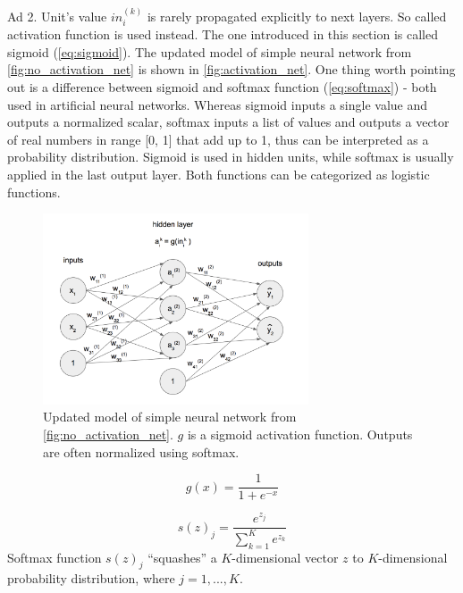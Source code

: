 \documentclass[11pt]{article}
\begin{document}
Ad 2. Unit's value $in_i^{(k)}$ is rarely propagated explicitly to next layers. So called activation function is used instead. The one introduced in this section is called sigmoid (\autoref{eq:sigmoid}). The updated model of simple neural network from \autoref{fig:no_activation_net} is shown in \autoref{fig:activation_net}. One thing worth pointing out is a difference between sigmoid and softmax function (\autoref{eq:softmax}) - both used in artificial neural networks. Whereas sigmoid inputs a single value and outputs a normalized scalar, softmax inputs a list of values and outputs a vector of real numbers in range [0, 1] that add up to 1, thus can be interpreted as a probability distribution. Sigmoid is used in hidden units, while softmax is usually applied in the last output layer. Both functions can be categorized as logistic functions.\\

\begin{figure}[h]
\includegraphics[width=0.7\textwidth]{activation_net}
\centering
\caption{Updated model of simple neural network from \autoref{fig:no_activation_net}. $g$ is a sigmoid activation function. Outputs are often normalized using softmax.}
\label{fig:activation_net}
\end{figure}

\begin{equation} \label{eq:sigmoid}
g(x) = \frac{1}{1 + e^{-x}}
\end{equation}

\begin{equation} \label{eq:softmax}
s(z)_j = \frac{e^{z_j}}{\sum_{k=1}^Ke^{z_k}}
\end{equation}
Softmax function $s(z)_j$ “squashes” a $K$-dimensional vector $z$ to $K$-dimensional probability distribution, where $j=1, ..., K$.\\
\end{document}
